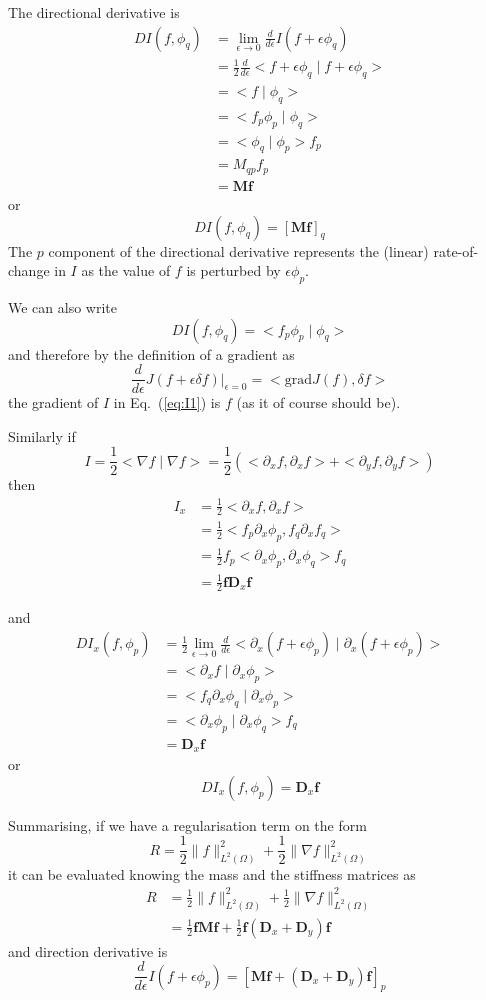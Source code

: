 \documentclass[10pt,a4paper]{book}
\newcommand{\p}{\partial}
\begin{document}
The directional derivative is
\begin{align*}
D I(f,\phi_q) &= \lim_{\epsilon \to 0} \frac{d}{d \epsilon} I(f+ \epsilon \phi_q) \\
              &= \frac{1}{2} \frac{d}{d \epsilon} < f+\epsilon \phi_q\mid f+\epsilon \phi_q> \\
              &= <f\mid \phi_q > \\
              &= <f_p \phi_p\mid \phi_q > \\
              &= < \phi_q\mid \phi_p > f_p \\
              &= M_{qp} f_p\\
              &= \bm{M} \bm{f}
\end{align*}
or
\[
D I(f,\phi_q) = [\bm{M} \bm{f}]_q
\]
The $p$ component of the directional derivative represents the (linear)
rate-of-change in $I$ as the value of $f$ is perturbed by
$\epsilon \phi_p$.

We can also write
\[ 
D I(f,\phi_q) = < f_p \phi_p\mid \phi_q> 
\]
and therefore by the definition of a gradient as
\[
\frac{d}{d \epsilon} J(f+\epsilon \delta f)|_{\epsilon=0} = < \mathrm{grad} J(f), \delta f>
\]
the gradient of $I$ in  Eq.~(\ref{eq:I1}) is $f$ (as it of course should be).

Similarly if
\[ 
I=\frac{1}{2} < \nabla f\mid \nabla f> = \frac{1}{2} ( <\p_x f, \p_x f> + < \p_y f, \p_y f> )
\]
then
\begin{align*}
 I_x & = \frac{1}{2} <\p_x f, \p_x f> \\ 
     &= \frac{1}{2} < f_p \p_x \phi_p, f_q \p_x f_q> \\
     &= \frac{1}{2} f_p <  \p_x \phi_p,  \p_x \phi_q> f_q\\
     &= \frac{1}{2} \bm{f} \bm{D}_x \bm{f}
\end{align*}

and
\begin{align*} 
D I_x(f,\phi_p) &= \frac{1}{2}\lim_{\epsilon \to 0} \frac{d}{d \epsilon} < \p_x (f +\epsilon \phi_p)\mid \p_x (f+\epsilon \phi_p) > \\
              &=  <\p_x f \mid \p_x \phi_p > \\
              &=  <f_q \p_x \phi_q \mid \p_x \phi_p > \\
              &=  <\p_x \phi_p \mid \p_x \phi_q > f_q\\
              &= \bm{D}_x \bm{f}
\end{align*}
or
\[
D I_x(f,\phi_p) = \bm{D}_x \bm{f}
\]


Summarising, if we have a regularisation term on the form
\[
R=\frac{1}{2} \| f \|^2_{L^2(\Omega)} + \frac{1}{2} \| \nabla f \|^2_{L^2(\Omega)}
\] 
it can be evaluated knowing the mass and the stiffness matrices as
\begin{align*}  
R &= \frac{1}{2} \| f \|^2_{L^2(\Omega)} + \frac{1}{2} \| \nabla f \|^2_{L^2(\Omega)} \\
  &= \frac{1}{2} \bm{f} \bm{M} \bm{f}  + \frac{1}{2} \bm{f} (\bm{D}_x + \bm{D}_y) \bm{f}
\end{align*}
and direction derivative is 
\[ \frac{d}{d\epsilon} I(f+\epsilon \phi_p) = [\bm{M} \bm{f} + (\bm{D}_x  + \bm{D}_y) \bm{f} ]_p \]
\end{document}
